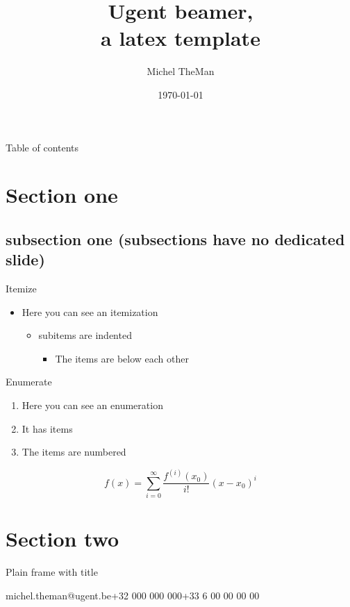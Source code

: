 \documentclass[ aspectratio=169]{beamer}
\title{Ugent beamer, \\a latex template}
\date{\today}
\author{Michel TheMan}
\institute{\textbf{Department of Environment}\\\vspace{-.4cm}Laboratory of Wood Technology, UGent-Woodlab }
\begin{document}
\frame{\titlepage} 
\begin{frame}{Table of contents}
	\tableofcontents
\end{frame} 
           
\section{Section one} 
\subsection{subsection one (subsections have no dedicated slide)}
  
\begin{frame}[fragile, t]{Itemize}    
\begin{itemize}
\item Here you can see an itemization
\begin{itemize}               
\item subitems are indented
\begin{itemize}
\item The items are below each other
\end{itemize}
\end{itemize}
\end{itemize}
\end{frame}
 
\begin{frame}{Enumerate}
\begin{enumerate}
\item Here you can see an enumeration 
\item It has items
\item The items are numbered    
\end{enumerate}
\[
	f(x)=\sum_{i=0}^\infty \frac{f^{(i)}(x_0)}{i!}(x-x_0)^i
\]
\end{frame}
  
\section{Section two}     
   
\begin{frame}[t]{Plain frame with title}
\lipsum[4]           
\end{frame}

	{michel.theman@ugent.be}{+32 000 000 000}{+33 6 00 00 00 00}    
\end{document}
